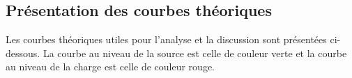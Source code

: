 \subsection{Présentation des courbes théoriques}
Les courbes théoriques utiles pour l'analyse et la discussion sont présentées ci-dessous. La courbe au niveau de la source est celle de couleur verte et la courbe au niveau de la charge est celle de couleur rouge.
\setcounter{subfigure}{0}
\begin{figure}[htb]
	\centering
{}
		\quad
		\quad

\end{figure}
